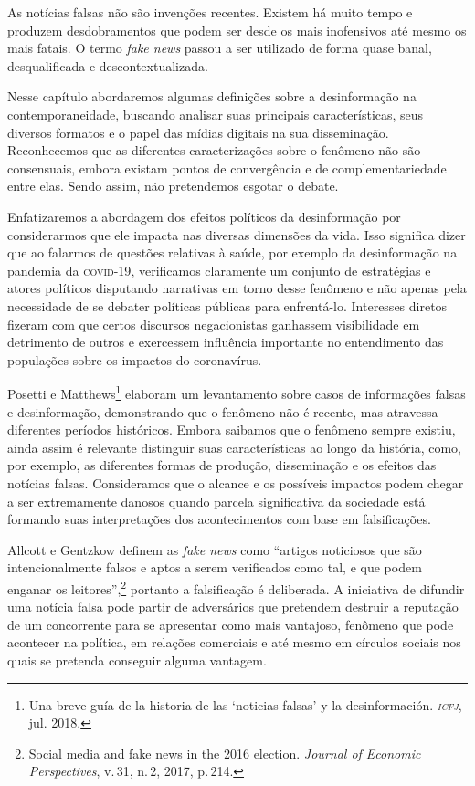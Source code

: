 As notícias falsas não são invenções recentes. Existem há muito tempo e
produzem desdobramentos que podem ser desde os mais inofensivos até
mesmo os mais fatais. O termo \textit{fake news} passou a ser utilizado de
forma quase banal, desqualificada e descontextualizada.

Nesse capítulo abordaremos algumas definições sobre a desinformação na
contemporaneidade, buscando analisar suas principais características,
seus diversos formatos e o papel das mídias digitais na sua
disseminação. Reconhecemos que as diferentes caracterizações sobre o
fenômeno não são consensuais, embora existam pontos de convergência e de
complementariedade entre elas. Sendo assim, não pretendemos esgotar o
debate.

Enfatizaremos a abordagem dos efeitos políticos da desinformação por
considerarmos que ele impacta nas diversas dimensões da vida. Isso
significa dizer que ao falarmos de questões relativas à saúde, por
exemplo da desinformação na pandemia da \textsc{covid-19}, verificamos claramente
um conjunto de estratégias e atores políticos disputando narrativas em
torno desse fenômeno e não apenas pela necessidade de se debater
políticas públicas para enfrentá-lo. Interesses diretos fizeram com que
certos discursos negacionistas ganhassem visibilidade em detrimento de
outros e exercessem influência importante no entendimento das populações
sobre os impactos do coronavírus.

Posetti e Matthews\footnote{Una breve guía de la historia
de las `noticias falsas' y la desinformación. \textit{\textsc{icfj}}, jul. 2018.} elaboram um levantamento sobre casos de
informações falsas e desinformação, demonstrando que o fenômeno não é
recente, mas atravessa diferentes períodos históricos. Embora saibamos
que o fenômeno sempre existiu, ainda assim é relevante distinguir suas
características ao longo da história, como, por exemplo, as diferentes
formas de produção, disseminação e os efeitos das notícias falsas. 
Consideramos que o alcance e os possíveis impactos podem chegar a ser 
extremamente danosos quando parcela significativa da sociedade está 
formando suas interpretações dos acontecimentos com base em falsificações.

Allcott e Gentzkow definem as \textit{fake news} como ``artigos
noticiosos que são intencionalmente falsos e aptos a serem verificados
como tal, e que podem enganar os leitores'',\footnote{Social media and fake news in the
2016 election. \textit{Journal of Economic Perspectives}, v.\,31, n.\,2, 2017, p.\,214.} portanto a falsificação é deliberada. A iniciativa de difundir uma
notícia falsa pode partir de adversários que pretendem destruir a
reputação de um concorrente para se apresentar como mais vantajoso,
fenômeno que pode acontecer na política, em relações comerciais e até
mesmo em círculos sociais nos quais se pretenda conseguir alguma
vantagem.


